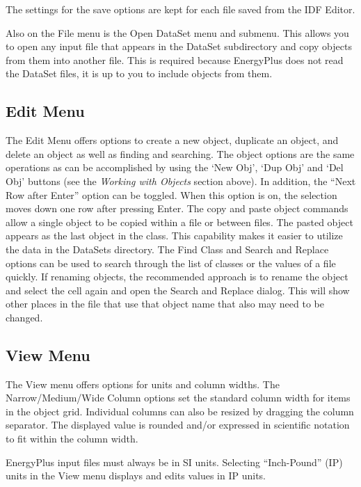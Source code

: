The settings for the save options are kept for each file saved from the IDF Editor.

Also on the File menu is the Open DataSet menu and submenu. This allows you to open any input file that appears in the DataSet subdirectory and copy objects from them into another file. This is required because EnergyPlus does not read the DataSet files, it is up to you to include objects from them.

\subsection{Edit Menu}\label{edit-menu-000}

The Edit Menu offers options to create a new object, duplicate an object, and delete an object as well as finding and searching. The object options are the same operations as can be accomplished by using the `New Obj', `Dup Obj' and `Del Obj' buttons (see the \emph{Working with Objects} section above). In addition, the ``Next Row after Enter'' option can be toggled. When this option is on, the selection moves down one row after pressing Enter. The copy and paste object commands allow a single object to be copied within a file or between files. The pasted object appears as the last object in the class. This capability makes it easier to utilize the data in the DataSets directory. The Find Class and Search and Replace options can be used to search through the list of classes or the values of a file quickly. If renaming objects, the recommended approach is to rename the object and select the cell again and open the Search and Replace dialog. This will show other places in the file that use that object name that also may need to be changed.

\subsection{View Menu}\label{view-menu-000}

The View menu offers options for units and column widths. The Narrow/Medium/Wide Column options set the standard column width for items in the object grid. Individual columns can also be resized by dragging the column separator. The displayed value is rounded and/or expressed in scientific notation to fit within the column width.

EnergyPlus input files must always be in SI units. Selecting ``Inch-Pound'' (IP) units in the View menu displays and edits values in IP units.

